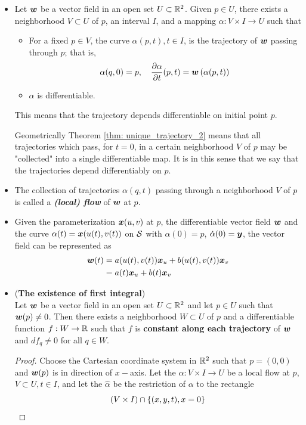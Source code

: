 \documentclass[11pt]{article}
\begin{document}
\begin{itemize}
\item \begin{theorem}\label{thm: unique_trajectory_2}
Let $\boldsymbol{w}$ be a vector field in an open set $U\subset {\mathbb R}^{2}$. Given $p\in U$, there exists a neighborhood $V\subset U$ of $p$, an interval $I$, and a mapping $\alpha: V\times I \rightarrow U$ such that 
\begin{itemize}
\item For a fixed $p\in V$, the curve $\alpha(p, t), t\in I$, is the trajectory of $\boldsymbol{w}$ passing through $p$; that is,
\begin{align*}
\alpha(q, 0)= p, \quad \frac{\partial \alpha}{ \partial t}(p,t) = \boldsymbol{w}\left(\alpha(p,t)\right)
\end{align*}

\item $\alpha$ is differentiable. 
\end{itemize}
\end{theorem}
This means that the trajectory depends differentiable on initial point $p$. 

Geometrically Theorem \ref{thm: unique_trajectory_2} means that all trajectories which pass, for $t = 0$, in a certain neighborhood $V$ of $p$ may be "collected" into a single differentiable map. It is in this sense that we say that the trajectories depend differentiably on $p$.

\item \begin{definition}
The collection of trajectories $\alpha(q,t)$ passing through a neighborhood $V$ of $p$ is called a \emph{\textbf{(local) flow}} of $\boldsymbol{w}$ at $p$.
\end{definition}

\item Given the parameterization $\boldsymbol{x}(u,v)$ at $p$, the differentiable vector field $\boldsymbol{w}$ and the curve $\alpha(t) = \boldsymbol{x}(u(t), v(t))$ on ${\mathcal S}$ with $\alpha(0)=p$, $\dot{\alpha}(0)= \boldsymbol{y}$, the vector field can be represented as 
\begin{align}
\boldsymbol{w}(t) &= a(u(t), v(t))\boldsymbol{x}_{u} + b(u(t), v(t))\boldsymbol{x}_{v} \nonumber\\
&= a(t)\boldsymbol{x}_{u} + b(t)\boldsymbol{x}_{v} \label{eqn: diff_vec_field}
\end{align}

\item \begin{lemma} (\textbf{The existence of first integral})\\
Let $\boldsymbol{w}$ be a vector field in an open set $U\subset {\mathbb R}^{2}$ and let $p\in U$ such that $\boldsymbol{w}(p)\neq 0$. Then there exists a neighborhood $W\subset U$ of $p$ and a differentiable function $f: W\rightarrow {\mathbb R}$ such that $f$ is \textbf{constant along each trajectory} of $\boldsymbol{w}$ and $df_{q}\neq 0$ for all $q\in W$.
\end{lemma}
\begin{proof}
Choose the Cartesian coordinate system in ${\mathbb R}^{2}$ such that $p=(0,0)$ and $\boldsymbol{w}(p)$ is in direction of $x-$axis. Let the $\alpha: V\times I\rightarrow U$ be a local flow at $p$, $V\subset U, t\in I$, and let the $\hat{\alpha}$ be the restriction of $\alpha$ to the rectangle
$$ (V\times I)\cap \left\{(x,y,t), x=0\right\}  $$



\end{proof}
\end{itemize}
\end{document}
